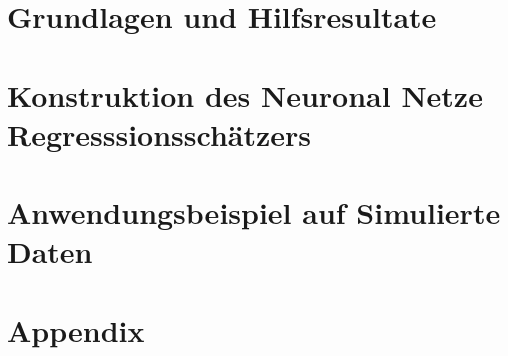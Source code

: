 \documentclass[12pt,a4paper,twoside]{report}
\begin{document}
\pagestyle{empty}


\cleardoublepage 


\cleardoublepage
\tableofcontents

\pagestyle{headings}


\chapter{Grundlagen und Hilfsresultate}
\chapter{Konstruktion des Neuronal Netze Regresssionsschätzers}
\chapter{Anwendungsbeispiel auf Simulierte Daten}
\chapter*{Appendix}


%
%
%
%
%
%
%


\end{document}
